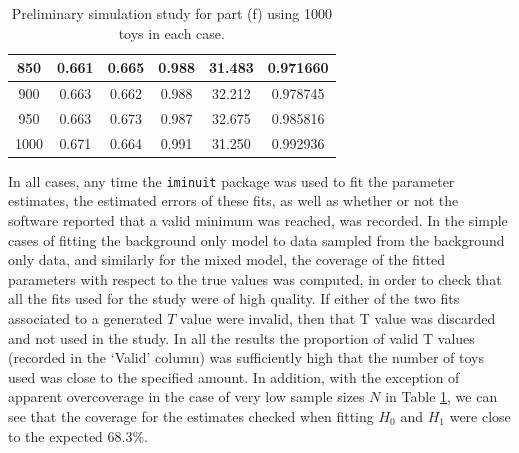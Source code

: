 \documentclass[12pt]{article}
\begin{document}
\begin{table}
\begin{tabular}{| c | c | c | c | c | c |}
        \hline
          850 & 0.661 & 0.665 & 0.988 & 31.483 & 0.971660 \\
        \hline
          900 & 0.663 & 0.662 & 0.988 & 32.212 & 0.978745 \\
        \hline
          950 & 0.663 & 0.673 & 0.987 & 32.675 & 0.985816 \\
        \hline
         1000 & 0.671 & 0.664 & 0.991 & 31.250 & 0.992936 \\
        \hline
\end{tabular}
\caption{Preliminary simulation study for part (f) using 1000 toys in each case.}
\label{tab_f_1}
\end{table}

In all cases, any time the \texttt{iminuit} package was used to fit the parameter estimates, the estimated errors of these fits, as well as whether or not the software reported that a valid minimum was reached, was recorded.
In the simple cases of fitting the background only model to data sampled from the background only data, and similarly for the mixed model, the coverage of the fitted parameters with respect to the true values was computed, in order to check that all the fits used for the study were of high quality.
If either of the two fits associated to a generated $T$ value were invalid, then that T value was discarded and not used in the study. In all the results the proportion of valid T values (recorded in the `Valid' column) was sufficiently high that the number of toys used was close to the specified amount.
In addition, with the exception of apparent overcoverage in the case of very low sample sizes $N$ in Table \ref{tab_f_1}, we can see that the coverage for the estimates checked when fitting $H_0$ and $H_1$ were close to the expected 68.3\%.
\end{document}
